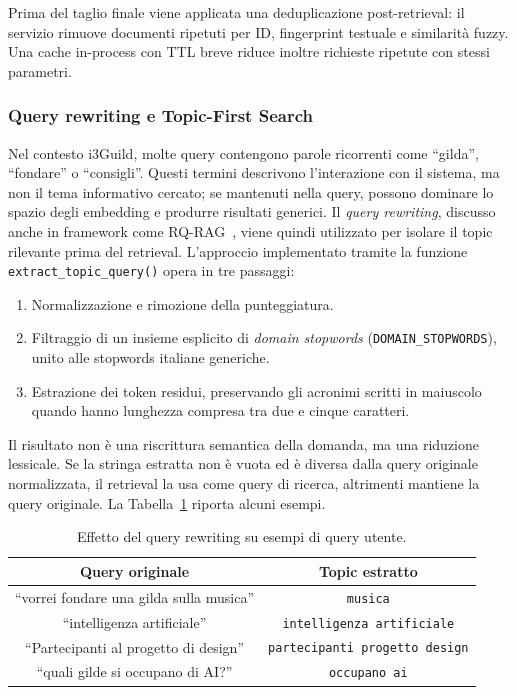 Prima del taglio finale viene applicata una deduplicazione post-retrieval: il
servizio rimuove documenti ripetuti per ID, fingerprint testuale e similarità
fuzzy. Una cache in-process con TTL breve riduce inoltre richieste ripetute con
stessi parametri.

\subsubsection{Query rewriting e Topic-First Search}
\label{subsubsec:query_rewriting}

Nel contesto i3Guild, molte query contengono parole ricorrenti come ``gilda'',
``fondare'' o ``consigli''. Questi termini descrivono l'interazione con il
sistema, ma non il tema informativo cercato; se mantenuti nella query, possono
dominare lo spazio degli embedding e produrre risultati generici. Il
\emph{query rewriting}, discusso anche in framework come
RQ-RAG~\cite{chan2024rqrag}, viene quindi utilizzato per isolare il topic
rilevante prima del retrieval. L'approccio implementato tramite la funzione
\texttt{extract\_topic\_query()} opera in tre passaggi:

\begin{enumerate}
  \item Normalizzazione e rimozione della punteggiatura.
  \item Filtraggio di un insieme esplicito di \emph{domain stopwords}
    (\texttt{DOMAIN\_STOPWORDS}), unito alle stopwords italiane generiche.
  \item Estrazione dei token residui, preservando gli acronimi scritti in
    maiuscolo quando hanno lunghezza compresa tra due e cinque caratteri.
\end{enumerate}

Il risultato non è una riscrittura semantica della domanda, ma una riduzione
lessicale. Se la stringa estratta non è vuota ed è diversa dalla query originale
normalizzata, il retrieval la usa come query di ricerca, altrimenti
mantiene la query originale. La Tabella~\ref{tab:query_rewriting} riporta alcuni
esempi.

\begin{table}[ht]
  \centering
  \caption{Effetto del query rewriting su esempi di query utente.}
  \label{tab:query_rewriting}
  \small
  \begin{tabular}{cc}
    \toprule
    \textbf{Query originale} & \textbf{Topic estratto}\\
    \midrule
    ``vorrei fondare una gilda sulla musica'' &
      \texttt{musica} \\
    ``intelligenza artificiale'' & \texttt{intelligenza artificiale} \\
    ``Partecipanti al progetto di design'' &
      \texttt{partecipanti progetto design} \\
    ``quali gilde si occupano di AI?'' &
      \texttt{occupano ai}\\
    \bottomrule
  \end{tabular}
\end{table}

